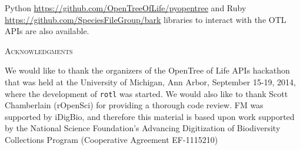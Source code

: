 \documentclass[12pt,letterpaper]{article}\usepackage[]{graphicx}\usepackage[]{color}
\renewcommand{\section}[1]{%
\bigskip
\begin{center}
\begin{Large}
\normalfont\scshape #1
\medskip
\end{Large}
\end{center}}
\begin{document}
Python \url{https://github.com/OpenTreeOfLife/pyopentree} and Ruby
\url{https://github.com/SpeciesFileGroup/bark} libraries to interact
with the OTL APIs are also available.


\section{Acknowledgments}
\label{sec:acknowledgments}

We would like to thank the organizers of the OpenTree of Life APIs hackathon
that was held at the University of Michigan, Ann Arbor, September 15-19, 2014,
where the development of \texttt{rotl} was started. We would also like to thank
Scott Chamberlain (rOpenSci) for providing a thorough code review. FM was
supported by iDigBio, and therefore this material is based upon work supported
by the National Science Foundation’s Advancing Digitization of Biodiversity
Collections Program (Cooperative Agreement EF-1115210)




\end{document}
